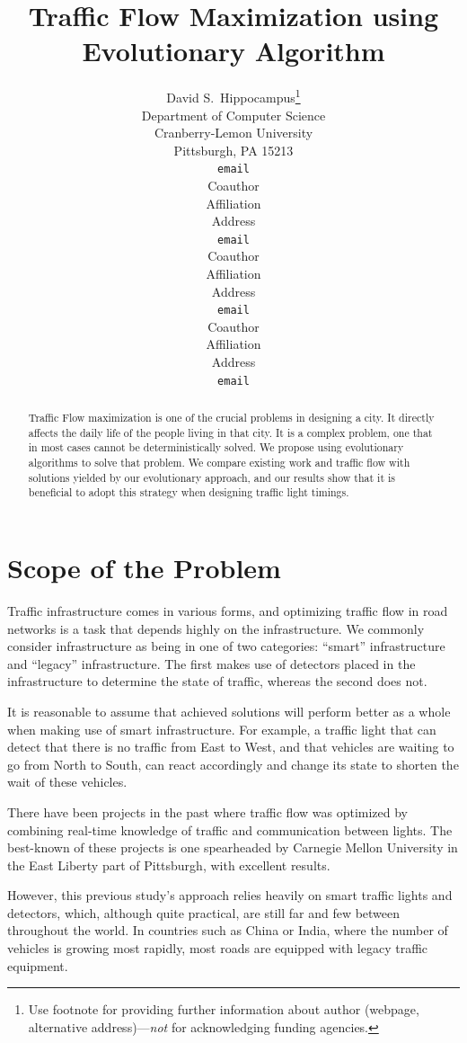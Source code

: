 \documentclass{article} %
\title{Traffic Flow Maximization using Evolutionary Algorithm}
\author{
David S.~Hippocampus\thanks{ Use footnote for providing further information
about author (webpage, alternative address)---\emph{not} for acknowledging
funding agencies.} \\
Department of Computer Science\\
Cranberry-Lemon University\\
Pittsburgh, PA 15213 \\
\texttt{email} \\
\And
Coauthor \\
Affiliation \\
Address \\
\texttt{email} \\
\AND
Coauthor \\
Affiliation \\
Address \\
\texttt{email} \\
\And
Coauthor \\
Affiliation \\
Address \\
\texttt{email} \\
}
\begin{document}
\maketitle

\begin{abstract}
Traffic Flow maximization is one of the crucial problems in designing a city. It directly affects the daily life of the people living in that city. It is a complex problem, one that in most cases cannot be deterministically solved. We propose using evolutionary algorithms to solve that problem. We compare existing work and traffic flow with solutions yielded by our evolutionary approach, and our results show that it is beneficial to adopt this strategy when designing traffic light timings.
\end{abstract}

\section{Scope of the Problem}

Traffic infrastructure comes in various forms, and optimizing traffic flow in road networks is a task that depends highly on the infrastructure. We commonly consider infrastructure as being in one of two categories:  ``smart'' infrastructure and ``legacy'' infrastructure. The first makes use of detectors placed in the infrastructure to determine the state of traffic, whereas the second does not.

It is reasonable to assume that achieved solutions will perform better as a whole when making use of smart infrastructure. For example, a traffic light that can detect that there is no traffic from East to West, and that vehicles are waiting to go from North to South, can react accordingly and change its state to shorten the wait of these vehicles.

There have been projects in the past where traffic flow was optimized by combining real-time knowledge of traffic and communication between lights. The best-known of these projects is one spearheaded by Carnegie Mellon University in the East Liberty part of Pittsburgh, with excellent results.

However, this previous study's approach relies heavily on smart traffic lights and detectors, which, although quite practical, are still far and few between throughout the world. In countries such as China or India, where the number of vehicles is growing most rapidly, most roads are equipped with legacy traffic equipment.
\end{document}
